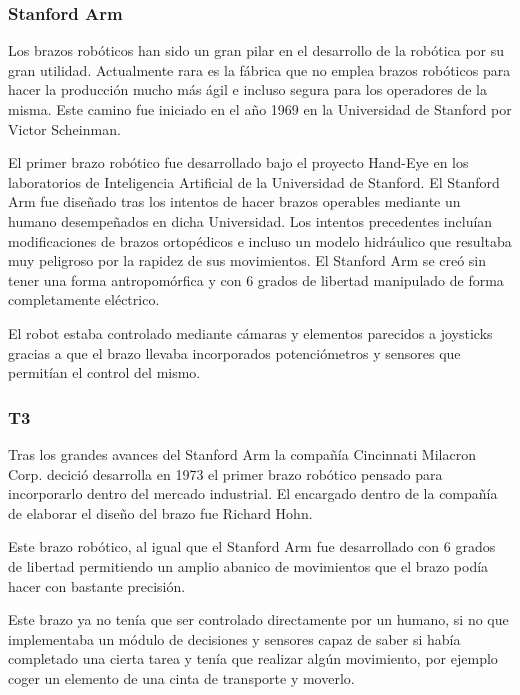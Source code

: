 \subsubsection{Stanford Arm}

Los brazos robóticos han sido un gran pilar en el desarrollo de la robótica por su gran utilidad. Actualmente rara es la fábrica que no emplea brazos robóticos para hacer la producción mucho más ágil e incluso segura para los operadores de la misma. Este camino fue iniciado en el año 1969 en la Universidad de Stanford por Victor Scheinman.

\vspace{10px}

El primer brazo robótico fue desarrollado bajo el proyecto Hand-Eye en los laboratorios de Inteligencia Artificial de la Universidad de Stanford. El Stanford Arm fue diseñado tras los intentos de hacer brazos operables mediante un humano desempeñados en dicha Universidad. Los intentos precedentes incluían modificaciones de brazos ortopédicos e incluso un modelo hidráulico que resultaba muy peligroso por la rapidez de sus movimientos. El Stanford Arm se creó sin tener una forma antropomórfica y con 6 grados de libertad manipulado de forma completamente eléctrico.

\vspace{10px}

El robot estaba controlado mediante cámaras y elementos parecidos a joysticks gracias a que el brazo llevaba incorporados potenciómetros y sensores que permitían el control del mismo.

\subsubsection{T3}

Tras los grandes avances del Stanford Arm la compañía Cincinnati Milacron Corp. decició desarrolla en 1973 el primer brazo robótico pensado para incorporarlo dentro del mercado industrial. El encargado dentro de la compañía de elaborar el diseño del brazo fue Richard Hohn.

\vspace{10px}

Este brazo robótico, al igual que el Stanford Arm fue desarrollado con 6 grados de libertad permitiendo un amplio abanico de movimientos que el brazo podía hacer con bastante precisión.

\vspace{10px}

Este brazo ya no tenía que ser controlado directamente por un humano, si no que implementaba un módulo de decisiones y sensores capaz de saber si había completado una cierta tarea y tenía que realizar algún movimiento, por ejemplo coger un elemento de una cinta de transporte y moverlo.

